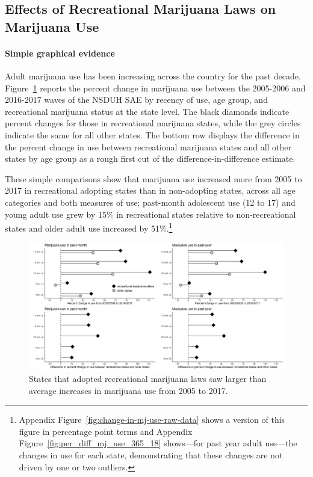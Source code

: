\documentclass[12pt]{article}%
\begin{document}
\subsection{Effects of Recreational Marijuana Laws on Marijuana Use}
\label{sec:results_recreational}

\paragraph{Simple graphical evidence}
Adult marijuana use has been increasing across the country for the past decade. 
Figure~\ref{fig:change-in-mj-use-percent} reports the percent change in marijuana use between the 2005-2006 and 2016-2017 waves of the NSDUH SAE by recency of use, age group, and recreational marijuana status at the state level. 
The black diamonds indicate percent changes for those in recreational marijuana states, while the grey circles indicate the same for all other states. 
The bottom row displays the difference in the percent change in use between recreational marijuana states and all other states by age group as a rough first cut of the difference-in-difference estimate. 

These simple comparisons show that marijuana use increased more from 2005 to 2017 in recreational adopting states than in non-adopting states, across all age categories and both measures of use; past-month adolescent use (12 to 17) and young adult use grew by 15\% in recreational states relative to non-recreational states and older adult use increased by 51\%.\footnote{{ Appendix Figure~\ref{fig:change-in-mj-use-raw-data} shows a version of this figure in percentage point terms and Appendix Figure~\ref{fig:per_diff_mj_use_365_18} shows---for past year adult use---the changes in use for each state, demonstrating that these changes are not driven by one or two outliers.}}

\begin{figure}[H]
    \caption{States that adopted recreational marijuana laws saw larger than average increases in marijuana use from 2005 to 2017.}
    \begin{minipage}{\linewidth}
        \includegraphics[width=\linewidth]{../output/plots/figure-1.png}
    \end{minipage}
        \label{fig:change-in-mj-use-percent}
\end{figure}
\end{document}
